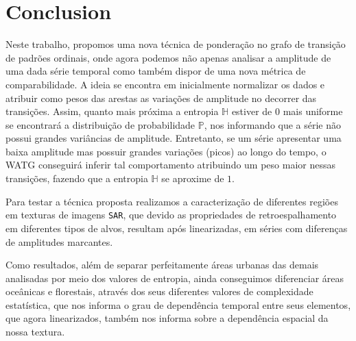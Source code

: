 \documentclass[12pt]{article}
\begin{document}
\section{Conclusion}\label{Conclusion}

Neste trabalho, propomos uma nova técnica de ponderação no grafo de transição de padrões ordinais, onde agora podemos não apenas analisar a amplitude de uma dada série temporal como também dispor de uma nova métrica de comparabilidade.
A ideia se encontra em inicialmente normalizar os dados e atribuir como pesos das arestas as variações de amplitude no decorrer das transições.
Assim, quanto mais próxima a entropia $\mathbb{H}$ estiver de $0$ mais uniforme se encontrará a distribuição de probabilidade $\mathbb{P}$, nos informando que a série não possui grandes variâncias de amplitude.
Entretanto, se um série apresentar uma baixa amplitude mas possuir grandes variações (picos) ao longo do tempo, o WATG conseguirá inferir tal comportamento atribuindo um peso maior nessas transições, fazendo que a entropia $\mathbb{H}$ se aproxime de $1$.

Para testar a técnica proposta realizamos a caracterização de diferentes regiões em texturas de imagens \texttt{SAR}, que devido as propriedades de retroespalhamento em diferentes tipos de alvos, resultam após linearizadas, em séries com diferenças de amplitudes marcantes. 

Como resultados, além de separar perfeitamente áreas urbanas das demais analisadas por meio dos valores de entropia, ainda conseguimos diferenciar áreas oceânicas e florestais, através dos seus diferentes valores de complexidade estatística, que nos informa o grau de dependência temporal entre seus elementos, que agora linearizados, também nos informa sobre a dependência espacial da nossa textura.



\end{document}
